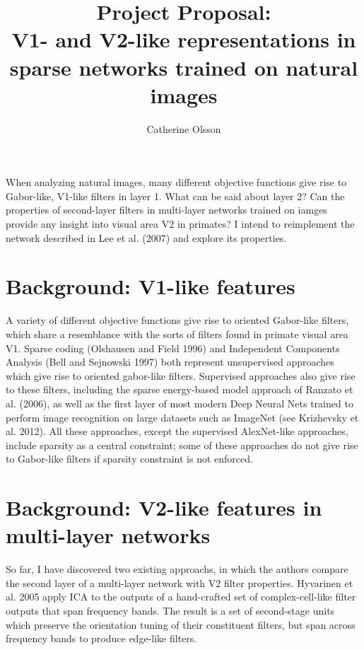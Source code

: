\documentclass[12pt]{article}
\title{Project Proposal:\\ V1- and V2-like representations in sparse networks trained on natural images}
\author{Catherine Olsson}
\begin{document}
\maketitle

When analyzing natural images, many different objective functions give rise to Gabor-like, V1-like filters in layer 1. What can be said about layer 2? Can the properties of second-layer filters in multi-layer networks trained on iamges provide any insight into visual area V2 in primates? I intend to reimplement the network described in Lee et al. (2007) and explore its properties.

\section*{Background: V1-like features}
A variety of different objective functions give rise to oriented Gabor-like filters, which share a resemblance with the sorts of filters found in primate visual area V1. Sparse coding (Olshausen and Field 1996) and Independent Components  Analysis (Bell and Sejnowski 1997) both represent unsupervised approaches which give rise to oriented gabor-like filters. Supervised approaches also give rise to these filters, including the sparse energy-based model approach of Ranzato et al. (2006), as well as the first layer of most modern Deep Neural Nets trained to perform image recognition on large datasets such as ImageNet (see Krizhevsky et al. 2012). All these approaches, except the supervised AlexNet-like approaches, include sparsity as a central constraint; some of these approaches do not give rise to Gabor-like filters if sparsity constraint is not enforced.


\section*{Background: V2-like features in multi-layer networks}

So far, I have discovered two existing approachs, in which the authors compare the second layer of a multi-layer network with V2 filter properties. Hyvarinen et al. 2005 apply ICA to the outputs of a hand-crafted set of complex-cell-like filter outputs that span frequency bands. The result is a set of second-stage units which preserve the orientation tuning of their constituent filters, but span across frequency bands to produce edge-like filters. 
\end{document}

